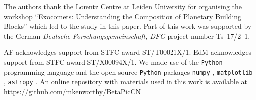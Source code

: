 \documentclass{aa}
\begin{document}
\begin{acknowledgements}

The authors thank the Lorentz Centre at Leiden University for organising the workshop ``Exocomets: Understanding the Composition of Planetary Building Blocks'' which led to the study in this paper. 
%
Part of this work was supported by the German \emph{Deut\-sche For\-schungs\-ge\-mein\-schaft, DFG\/} project number Ts~17/2--1.

AF acknowledges support from STFC award ST/T00021X/1. EdM acknowledges support from STFC award ST/X00094X/1.
%
We made use of the {\tt Python} programming language \citep{rossum1995} and the open-source {\tt Python} packages {\tt numpy} \citep{walt2011}, {\tt matplotlib} \citep{hunter2007}, {\tt astropy} \citep{astropy2013}.
%      
An online repository with materials used in this work is available at \url{https://github.com/mkenworthy/BetaPicCN}

\end{acknowledgements}










   
  


\end{document}
